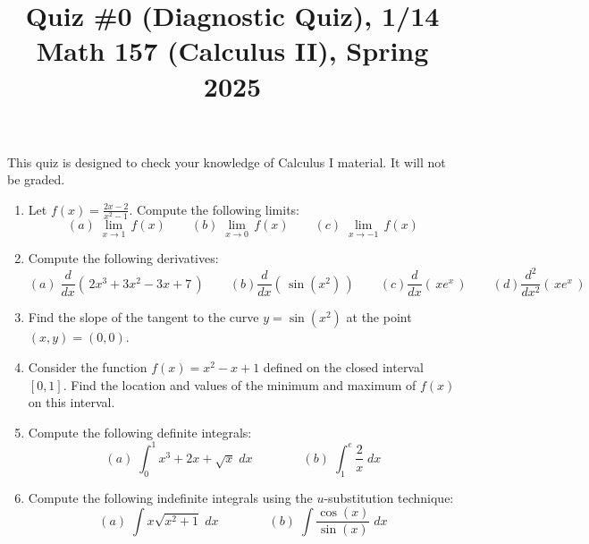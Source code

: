 \documentclass[11pt]{article}
\title{Quiz \#0 (Diagnostic Quiz), 1/14 \\ Math 157 (Calculus II), Spring 2025}
\date{}
\begin{document}
\maketitle

\thispagestyle{empty}

This quiz is designed to check your knowledge of Calculus I material. It will not be graded.

\begin{enumerate}
\item Let $\displaystyle f(x) = \frac{2x-2}{x^2-1}$. Compute the following limits:
\[ (a) \; \lim_{x \to 1} \, f(x) \qquad (b) \; \lim_{x \to 0} \, f(x) \qquad (c) \; \lim_{x \to -1} \, f(x)\]

\item Compute the following derivatives:
\[ (a) \; \frac{d}{dx}(\, 2x^3+3x^2-3x+7\, ) \qquad (b) \frac{d}{dx}(\, \sin(x^2) \,) \qquad (c) \frac{d}{dx} (\, x e^x \,) \qquad (d) \frac{d^2}{dx^2} (\, x e^x \,) \]

\item Find the slope of the tangent to the curve $y= \sin(x^2)$ at the point $(x,y) = (0,0)$.

\item Consider the function $f(x) = x^2-x+1$ defined on the closed interval $[0,1]$. Find the location and values of the minimum and maximum of $f(x)$ on this interval.

\item Compute the following definite integrals:
\[ (a) \; \int_{0}^{1} x^3 + 2x + \sqrt{x} \; dx \qquad \qquad (b) \; \int_{1}^{e} \frac{2}{x} \; dx \]

\item Compute the following indefinite integrals using the $u$-substitution technique:
\[ (a) \; \int x \sqrt{x^2+1} \; dx \qquad \qquad (b) \; \int \frac{\cos(x)}{\sin(x)} \; dx \]


\end{enumerate}
\end{document}
